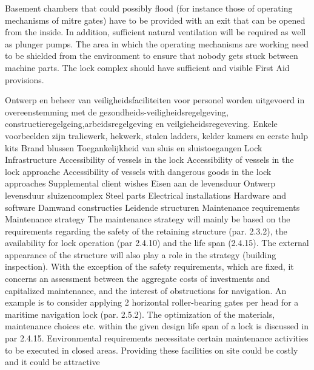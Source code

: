 Basement chambers that could possibly flood (for instance those of operating mechanisms of mitre
gates) have to be provided with an exit that can be opened from the inside. In addition, sufficient
natural ventilation will be required as well as plunger pumps.
The area in which the operating mechanisms are working need to be shielded from the environment to
ensure that nobody gets stuck between machine parts. The lock complex should have sufficient and visible
First Aid provisions.

Ontwerp en beheer van veiligheidsfaciliteiten voor personel worden uitgevoerd in overeenstemming met de gezondheids-veiligheidsregelgeving, constructieregelgeing,arbeidsregelgeving en veilgieheidsregeveving. Enkele voorbeelden zijn traliewerk, hekwerk, stalen ladders, kelder kamers en eerste hulp kits
Brand blussen
Toegankelijkheid van sluis en sluistoegangen
Lock Infrastructure
Accessibility of vessels in the lock
Accessibility of vessels in the lock approache
Accessibility of vessels with dangerous goods in the lock approaches
\newline \indent Supplemental client wishes
\newline \indent Eisen aan de levensduur
Ontwerp levensduur sluizencomplex
Steel parts
Electrical installations
Hardware and software
Damwand constructies
Leidende structuren
Maintenance requirements
Maintenance strategy
The maintenance strategy will mainly be based on the requirements regarding the safety of the retaining
structure (par. 2.3.2), the availability for lock operation (par 2.4.10) and the life span (2.4.15). The
external appearance of the structure will also play a role in the strategy (building inspection). With the
exception of the safety requirements, which are fixed, it concerns an assessment between the aggregate
costs of investments and capitalized maintenance, and the interest of obstructions for navigation. An
example is to consider applying 2 horizontal roller-bearing gates per head for a maritime navigation lock
(par. 2.5.2). The optimization of the materials, maintenance choices etc. within the given design life span
of a lock is discussed in par 2.4.15. Environmental requirements necessitate certain maintenance activities
to be executed in closed areas. Providing these facilities on site could be costly and it could be attractive
